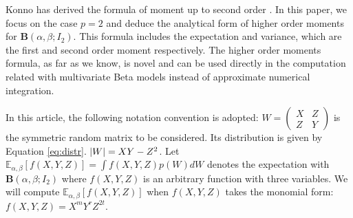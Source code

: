 \documentclass[twoside]{article}%
\DeclarePairedDelimiter\abs{\lvert}{\rvert}
\def\E{\mathbb{E}}
\begin{document}
Konno has derived the formula of moment up to second order \cite{konno_1988}.
In this paper, we focus on the case $p=2$ and deduce the analytical form of 
higher order moments for $\mathbf{B}(\alpha, \beta; I_2)$.
This formula
includes the expectation and variance, which are the first and second
order moment respectively. The higher order moments formula, as
far as we know, is novel and can be used directly in the computation
related with multivariate Beta models instead of approximate
numerical integration.

In this article, the following notation convention is adopted:
$W=\begin{pmatrix} X & Z \\ Z & Y \end{pmatrix}$ is the symmetric random
matrix to be considered. Its distribution is given by Equation \eqref{eq:distr}.
$\abs{W}=XY-Z^2$.
Let $\E_{\alpha,\beta}[f(X,Y, Z)] = \int f(X,Y,Z)p(W)dW$ denotes the expectation
with $\mathbf{B}(\alpha, \beta;I_2)$ where $f(X, Y, Z)$ is an arbitrary function with three
variables. We will compute $\E_{\alpha,\beta}[f(X,Y, Z)]$
when $f(X,Y,Z)$ takes the monomial form: $f(X,Y,Z)=X^m Y^r Z^{2t}$.
\end{document}
